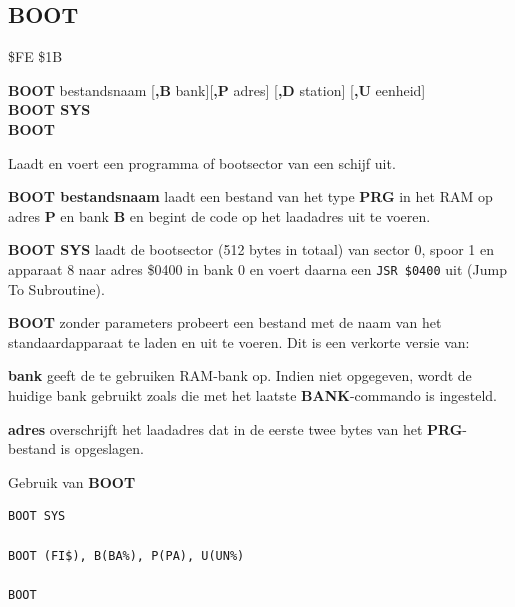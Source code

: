 \subsection{BOOT}
\begin{description}[leftmargin=2cm,style=nextline]
\item [Token:]    \$FE \$1B

\item [Formaat:]   {\bf BOOT} bestandsnaam [{\bf,B} bank][{\bf,P} adres] [{\bf,D} station] [{\bf,U} eenheid] \\                {\bf BOOT SYS} \\                  {\bf BOOT}

\item [Gebruik:]    Laadt en voert een programma of bootsector van een schijf uit.

{\bf BOOT bestandsnaam} laadt een bestand van het type {\bf PRG} in het RAM op adres {\bf P} en bank {\bf B} en begint de code op het laadadres uit te voeren.

                  {\bf BOOT SYS} laadt de bootsector (512 bytes in totaal) van sector 0, spoor 1 en apparaat 8 naar adres \$0400 in bank 0 en voert daarna een \texttt{JSR \$0400} uit (Jump To Subroutine).

                  {\bf BOOT} zonder parameters probeert een bestand met de naam  van het standaardapparaat te laden en uit te voeren. Dit is een verkorte versie van: 

                  \filenamedefinition

                  {\bf bank} geeft de te gebruiken RAM-bank op. Indien niet opgegeven, wordt de huidige bank gebruikt zoals die met het laatste {\bf BANK}-commando is ingesteld.

{\bf adres} overschrijft het laadadres dat in de eerste twee bytes van het {\bf PRG}-bestand is opgeslagen.

                  \drivedefinition

                  \unitdefinition

\item [Voorbeelden:] Gebruik van {\bf BOOT}

\begin{tcolorbox}[colback=black,coltext=white]
\verbatimfont{\codefont}
\begin{verbatim}
BOOT SYS

BOOT (FI$), B(BA%), P(PA), U(UN%)

BOOT
\end{verbatim}
\end{tcolorbox}
\end{description}

